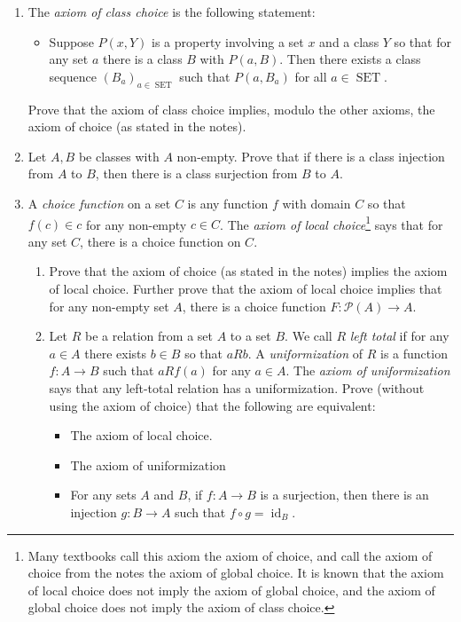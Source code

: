 \documentclass{amsart}
\theoremstyle{definition}
\newcommand{\Set}{\operatorname{SET}}
\newcommand{\SET}{\Set}
\newcommand{\seq}[2]{\left(#1\right)_{#2}}
\newcommand{\Ps}{\mathcal{P}}
\newcommand{\id}{\operatorname{id}}
\begin{document}
\begin{enumerate}
\item The \emph{axiom of class choice} is the following statement:
  \begin{itemize}
  \item[] Suppose $P (x, Y)$ is a property involving a set $x$ and a class $Y$ so that for any set $a$ there is a class $B$ with $P (a, B)$. Then there exists a class sequence $\seq{B_a}{a \in \SET}$ such that $P (a, B_a)$ for all $a \in \Set$.
  \end{itemize}

  Prove that the axiom of class choice implies, modulo the other axioms, the axiom of choice (as stated in the notes).
\item Let $A, B$ be classes with $A$ non-empty. Prove that if there is a class injection from $A$ to $B$, then there is a class surjection from $B$ to $A$.      
\item A \emph{choice function} on a set $C$ is any function $f$ with domain $C$ so that $f (c) \in c$ for any non-empty $c \in C$. The \emph{axiom of local choice}\footnote{Many textbooks call this axiom the axiom of choice, and call the axiom of choice from the notes the axiom of global choice. It is known that the axiom of local choice does not imply the axiom of global choice, and the axiom of global choice does not imply the axiom of class choice.} says that for any set $C$, there is a choice function on $C$.

  \begin{enumerate}
  \item Prove that the axiom of choice (as stated in the notes) implies the axiom of local choice. Further prove that the axiom of local choice implies that for any non-empty set $A$, there is a choice function $F: \Ps (A) \to A$.
  \item Let $R$ be a relation from a set $A$ to a set $B$. We call $R$ \emph{left total} if for any $a \in A$ there exists $b \in B$ so that $a R b$. A \emph{uniformization} of $R$ is a function $f: A \to B$ such that $a R f (a)$ for any $a \in A$. The \emph{axiom of uniformization} says that any left-total relation has a uniformization. Prove (without using the axiom of choice) that the following are equivalent:
    
  \begin{itemize}
  \item The axiom of local choice.
  \item The axiom of uniformization
  \item For any sets $A$ and $B$, if $f: A \to B$ is a surjection, then there is an injection $g: B \to A$ such that $f \circ g = \id_B$.
  \end{itemize}
  \end{enumerate}




\end{enumerate}
\end{document}
